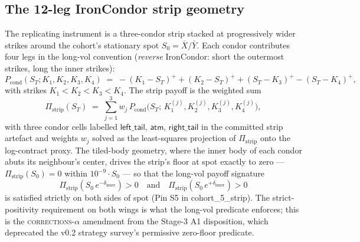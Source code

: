 \documentclass[11pt,letterpaper]{article}
\newcommand{\Xbar}{\bar{X}}
\newcommand{\Ybar}{\bar{Y}}
\begin{document}
\subsection{The 12-leg IronCondor strip geometry}
\label{sec:det:strip}

The replicating instrument is a three-condor strip stacked at progressively
wider strikes around the cohort's stationary spot $S_{0} = \Xbar/\Ybar$.
Each condor contributes four legs in the long-vol convention
(\emph{reverse} IronCondor: short the outermost strikes, long the inner
strikes):
\begin{equation}
    P_{\text{cond}}(S_{T}; K_{1},K_{2},K_{3},K_{4})
    \;=\;
    -(K_{1} - S_{T})^{+} + (K_{2} - S_{T})^{+}
    + (S_{T} - K_{3})^{+} - (S_{T} - K_{4})^{+},
    \label{eq:condor-payoff}
\end{equation}
with strikes $K_{1} < K_{2} < K_{3} < K_{4}$. The strip payoff is the
weighted sum
\begin{equation}
    \Pi_{\text{strip}}(S_{T})
    \;=\;
    \sum_{j=1}^{3} w_{j}\,
    P_{\text{cond}}\bigl(S_{T};\,K_{1}^{(j)},K_{2}^{(j)},K_{3}^{(j)},K_{4}^{(j)}\bigr),
    \label{eq:strip-payoff}
\end{equation}
with three condor cells labelled $\textsf{left\_tail}$, $\textsf{atm}$,
$\textsf{right\_tail}$ in the committed strip artefact and weights $w_{j}$
solved as the least-squares projection of $\Pi_{\text{strip}}$ onto the
log-contract proxy. The tiled-body geometry, where the inner body of each
condor abuts its neighbour's center, drives the strip's floor at spot
exactly to zero — $\Pi_{\text{strip}}(S_{0}) = 0$ within $10^{-9}\cdot S_{0}$
— so that the long-vol payoff signature
\begin{equation}
    \Pi_{\text{strip}}(S_{0}\,e^{-\delta_{\text{inner}}}) > 0
    \quad\text{and}\quad
    \Pi_{\text{strip}}(S_{0}\,e^{+\delta_{\text{inner}}}) > 0
    \label{eq:long-vol-signature}
\end{equation}
is satisfied strictly on both sides of spot (Pin S5 in
\textsf{cohort\_5\_strip}). The strict-positivity requirement on both
wings is what the long-vol predicate enforces; this is the
\textsc{corrections-$\alpha$} amendment from the Stage-3 A1 disposition,
which deprecated the v0.2 strategy survey's permissive zero-floor
predicate.
\end{document}
